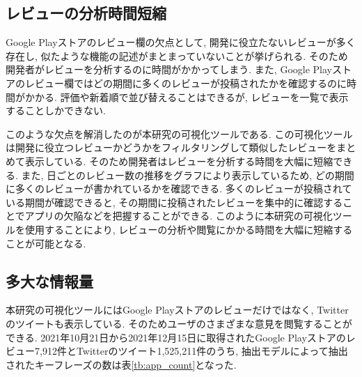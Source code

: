 


\subsection{レビューの分析時間短縮}
Google Playストアのレビュー欄の欠点として, 開発に役立たないレビューが多く存在し, 似たような機能の記述がまとまっていないことが挙げられる. そのため開発者がレビューを分析するのに時間がかかってしまう. 
また, Google Playストアのレビュー欄ではどの期間に多くのレビューが投稿されたかを確認するのに時間がかかる. 評価や新着順で並び替えることはできるが, レビューを一覧で表示することしかできない. 

このような欠点を解消したのが本研究の可視化ツールである. この可視化ツールは開発に役立つレビューかどうかをフィルタリングして類似したレビューをまとめて表示している. そのため開発者はレビューを分析する時間を大幅に短縮できる. 
また, 日ごとのレビュー数の推移をグラフにより表示しているため, どの期間に多くのレビューが書かれているかを確認できる. 
多くのレビューが投稿されている期間が確認できると, その期間に投稿されたレビューを集中的に確認することでアプリの欠陥などを把握することができる. 
このように本研究の可視化ツールを使用することにより, レビューの分析や閲覧にかかる時間を大幅に短縮することが可能となる. 

\subsection{多大な情報量}
本研究の可視化ツールにはGoogle Playストアのレビューだけではなく, Twitterのツイートも表示している. そのためユーザのさまざまな意見を閲覧することができる. 
2021年10月21日から2021年12月15日に取得されたGoogle Playストアのレビュー7,912件とTwitterのツイート1,525,211件のうち, 抽出モデルによって抽出されたキーフレーズの数は表\ref{tb:app_count}となった. 

